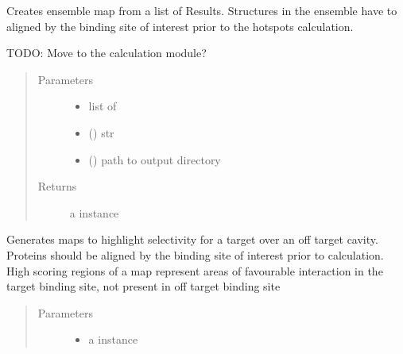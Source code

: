 \documentclass[letterpaper,10pt,english]{sphinxmanual}
\begin{document}
\begin{fulllineitems}
\begin{fulllineitems}
Creates ensemble map from a list of Results. Structures in the ensemble have to aligned by the
binding site of interest prior to the hotspots calculation.

TODO: Move to the calculation module?
\begin{quote}\begin{description}
\item[{Parameters}] \leavevmode\begin{itemize}
\item {} 
 \textendash{} list of 

\item {} 
 () \textendash{} str

\item {} 
 () \textendash{} path to output directory

\end{itemize}

\item[{Returns}] \leavevmode
a {\hyperref[\detokenize{result_api:hotspots.result.Results}]{}} instance

\end{description}\end{quote}

\end{fulllineitems}


\begin{fulllineitems}
\label{\detokenize{result_api:hotspots.result.Results.get_difference_map}}

Generates maps to highlight selectivity for a target over an off target cavity. Proteins should be aligned
by the binding site of interest prior to calculation.
High scoring regions of a map represent areas of favourable interaction in the target binding site, not
present in off target binding site
\begin{quote}\begin{description}
\item[{Parameters}] \leavevmode\begin{itemize}
\item {} 
 \textendash{} a {\hyperref[\detokenize{result_api:hotspots.result.Results}]{}} instance


\end{itemize}
\end{description}
\end{quote}
\end{fulllineitems}
\end{fulllineitems}
\end{document}
